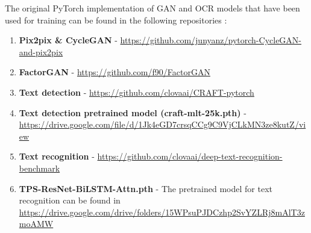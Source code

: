 \begin{table}[H]
\caption{Best parameter setting used in the experiments for each GAN}
\label{tab:tabparam}
\end{table}

The original PyTorch implementation of GAN and OCR models that have been used for training can be found in the following repositories :
\newline
\begin{enumerate}
\item \textbf{Pix2pix \& CycleGAN} - \url{https://github.com/junyanz/pytorch-CycleGAN-and-pix2pix}

\item \textbf{FactorGAN} - \url{https://github.com/f90/FactorGAN}

\item \textbf{Text detection} - \url{https://github.com/clovaai/CRAFT-pytorch}

\item \textbf{Text detection pretrained model (craft-mlt-25k.pth)} - \url{https://drive.google.com/file/d/1Jk4eGD7crsqCCg9C9VjCLkMN3ze8kutZ/view}

\item \textbf{Text recognition} - \url{https://github.com/clovaai/deep-text-recognition-benchmark}

\item \textbf{TPS-ResNet-BiLSTM-Attn.pth} - The pretrained model for text recognition can be found in \url{https://drive.google.com/drive/folders/15WPsuPJDCzhp2SvYZLRj8mAlT3zmoAMW}
\end{enumerate}

